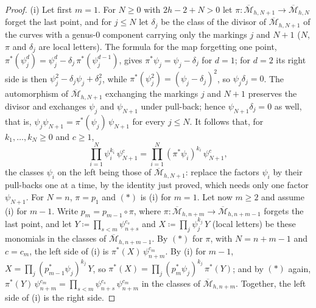 \begin{proof}
(i) Let first $m=1$. For $N\geq0$ with $2h-2+N>0$ let $\pi\colon\overline{\mathcal M}_{h,N+1}\to\overline{\mathcal M}_{h,N}$ forget the last point, and for $j\leq N$ let $\delta_j$ be the class of the divisor of $\overline{\mathcal M}_{h,N+1}$ of the curves with a genus-$0$ component carrying only the markings $j$ and $N+1$ ($N$, $\pi$ and $\delta_j$ are local letters). The formula \cite[(8)]{PPZ15} for the map forgetting one point, $\pi^*(\psi_j^d)=\psi_j^d-\delta_j\,\pi^*(\psi_j^{d-1})$, gives $\pi^*\psi_j=\psi_j-\delta_j$ for $d=1$; for $d=2$ its right side is then $\psi_j^2-\delta_j\psi_j+\delta_j^2$, while $\pi^*(\psi_j^2)=(\psi_j-\delta_j)^2$, so $\psi_j\delta_j=0$. The automorphism of $\overline{\mathcal M}_{h,N+1}$ exchanging the markings $j$ and $N+1$ preserves the divisor and exchanges $\psi_j$ and $\psi_{N+1}$ under pull-back; hence $\psi_{N+1}\delta_j=0$ as well, that is, $\psi_j\psi_{N+1}=\pi^*(\psi_j)\,\psi_{N+1}$ for every $j\leq N$. It follows that, for $k_1,\dots,k_N\geq0$ and $c\geq1$,
\[
\textstyle\prod_{i=1}^N\psi_i^{k_i}\,\psi_{N+1}^c=\prod_{i=1}^N(\pi^*\psi_i)^{k_i}\,\psi_{N+1}^c,\tag{$*$}
\]
the classes $\psi_i$ on the left being those of $\overline{\mathcal M}_{h,N+1}$: replace the factors $\psi_i$ by their pull-backs one at a time, by the identity just proved, which needs only one factor $\psi_{N+1}$. For $N=n$, $\pi=p_1$ and $(*)$ is (i) for $m=1$. Let now $m\geq2$ and assume (i) for $m-1$. Write $p_m=p_{m-1}\circ\pi$, where $\pi\colon\overline{\mathcal M}_{h,n+m}\to\overline{\mathcal M}_{h,n+m-1}$ forgets the last point, and let $Y\coloneqq\prod_{s<m}\psi_{n+s}^{c_s}$ and $X\coloneqq\prod_j\psi_j^{k_j}\,Y$ (local letters) be these monomials in the classes of $\overline{\mathcal M}_{h,n+m-1}$. By $(*)$ for $\pi$, with $N=n+m-1$ and $c=c_m$, the left side of (i) is $\pi^*(X)\,\psi_{n+m}^{c_m}$. By (i) for $m-1$, $X=\prod_j(p_{m-1}^*\psi_j)^{k_j}\,Y$, so $\pi^*(X)=\prod_j(p_m^*\psi_j)^{k_j}\,\pi^*(Y)$; and by $(*)$ again, $\pi^*(Y)\,\psi_{n+m}^{c_m}=\prod_{s<m}\psi_{n+s}^{c_s}\,\psi_{n+m}^{c_m}$ in the classes of $\overline{\mathcal M}_{h,n+m}$. Together, the left side of (i) is the right side.


\end{proof}
